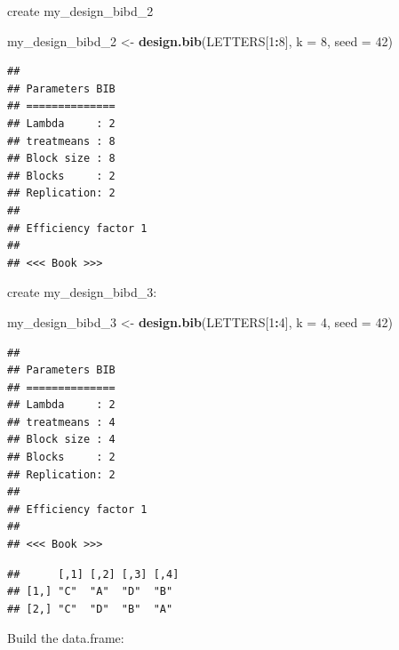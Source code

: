 \documentclass[]{book}
\newenvironment{Shaded}{\begin{snugshade}}{\end{snugshade}}
\newcommand{\DataTypeTok}[1]{\textcolor[rgb]{0.13,0.29,0.53}{#1}}
\newcommand{\DecValTok}[1]{\textcolor[rgb]{0.00,0.00,0.81}{#1}}
\newcommand{\KeywordTok}[1]{\textcolor[rgb]{0.13,0.29,0.53}{\textbf{#1}}}
\newcommand{\NormalTok}[1]{#1}
\newcommand{\OperatorTok}[1]{\textcolor[rgb]{0.81,0.36,0.00}{\textbf{#1}}}
\newcommand{\StringTok}[1]{\textcolor[rgb]{0.31,0.60,0.02}{#1}}
\begin{document}
create my\_design\_bibd\_2

\begin{Shaded}
\begin{Highlighting}[]
\NormalTok{my_design_bibd_}\DecValTok{2}\NormalTok{ <-}\StringTok{ }\KeywordTok{design.bib}\NormalTok{(LETTERS[}\DecValTok{1}\OperatorTok{:}\DecValTok{8}\NormalTok{], }\DataTypeTok{k =} \DecValTok{8}\NormalTok{, }\DataTypeTok{seed =} \DecValTok{42}\NormalTok{)}
\end{Highlighting}
\end{Shaded}

\begin{verbatim}
## 
## Parameters BIB
## ==============
## Lambda     : 2
## treatmeans : 8
## Block size : 8
## Blocks     : 2
## Replication: 2 
## 
## Efficiency factor 1 
## 
## <<< Book >>>
\end{verbatim}

create my\_design\_bibd\_3:

\begin{Shaded}
\begin{Highlighting}[]
\NormalTok{my_design_bibd_}\DecValTok{3}\NormalTok{ <-}\StringTok{ }\KeywordTok{design.bib}\NormalTok{(LETTERS[}\DecValTok{1}\OperatorTok{:}\DecValTok{4}\NormalTok{], }\DataTypeTok{k =} \DecValTok{4}\NormalTok{, }\DataTypeTok{seed =} \DecValTok{42}\NormalTok{)}
\end{Highlighting}
\end{Shaded}

\begin{verbatim}
## 
## Parameters BIB
## ==============
## Lambda     : 2
## treatmeans : 4
## Block size : 4
## Blocks     : 2
## Replication: 2 
## 
## Efficiency factor 1 
## 
## <<< Book >>>
\end{verbatim}

\begin{Shaded}
\end{Shaded}

\begin{verbatim}
##      [,1] [,2] [,3] [,4]
## [1,] "C"  "A"  "D"  "B" 
## [2,] "C"  "D"  "B"  "A"
\end{verbatim}

Build the data.frame:
\end{document}
